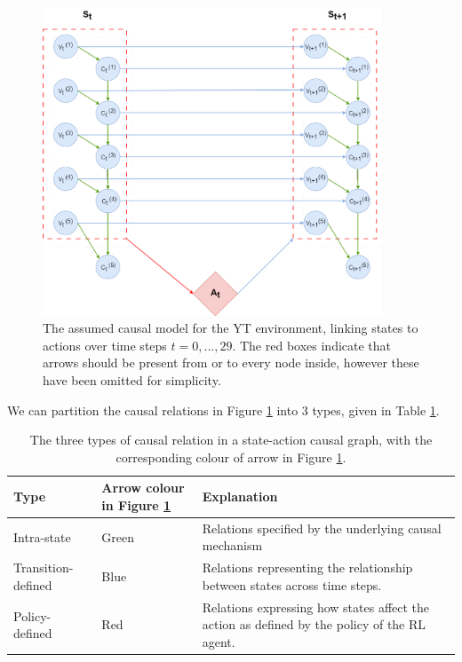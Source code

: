 \documentclass{article}
\begin{document}
\begin{figure}[htp]
    \centering
    \includegraphics[width=0.9\textwidth]{Images/YT Causal Diagram.drawio.png}
    \caption{The assumed causal model for the YT environment, linking states to actions over time steps $t= 0,...,29$. The red boxes indicate that arrows should be present from or to every node inside, however these have been omitted for simplicity.}
    \label{fig: YT causal graph}
\end{figure}

We can partition the causal relations in Figure \ref{fig: YT causal graph} into 3 types, given in Table \ref{tab:causal_relations}. 


\begin{table}[h!]
    \centering
    \small
    \begin{tabular}{ | m{} | m{}| m{}|} 
      \hline
       \textbf{Type} & \textbf{Arrow colour in Figure \ref{fig: YT causal graph}} & \textbf{Explanation}\\ 
      \hline
         Intra-state & Green & Relations specified by the underlying causal mechanism \\ 
      \hline
         Transition-defined & Blue & Relations representing the relationship between states across time steps. \\ 
      \hline
         Policy-defined & Red & Relations expressing how states affect the action as defined by the policy of the RL agent.\\ 
      \hline
     
    \end{tabular}
    \caption{The three types of causal relation in a state-action causal graph, with the corresponding colour of arrow in Figure \ref{fig: YT causal graph}.}
    \label{tab:causal_relations}
\end{table}
\end{document}
